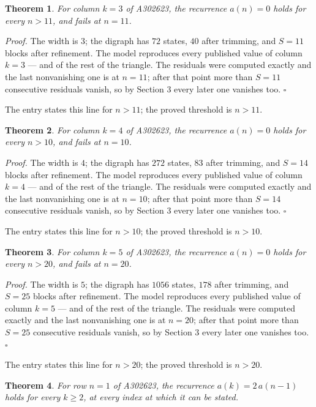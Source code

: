 \documentclass[11pt]{article}
\newtheorem{theorem}{Theorem}
\theoremstyle{definition}
\begin{document}
\begin{theorem} For column $k = 3$ of A302623, the recurrence $a(n) = 0$ holds for every $n > 11$, and fails at $n = 11$.\end{theorem}

{\itshape Proof.} The width is $3$; the digraph has $72$ states, $40$ after trimming, and $S = 11$ blocks after refinement. The model reproduces every published value of column $k = 3$ --- and of the rest of the triangle. The residuals were computed exactly and the last nonvanishing one is at $n = 11$; after that point more than $S = 11$ consecutive residuals vanish, so by Section 3 every later one vanishes too. $\square$

The entry states this line for $n > 11$; the proved threshold is $n > 11$.

\begin{theorem} For column $k = 4$ of A302623, the recurrence $a(n) = 0$ holds for every $n > 10$, and fails at $n = 10$.\end{theorem}

{\itshape Proof.} The width is $4$; the digraph has $272$ states, $83$ after trimming, and $S = 14$ blocks after refinement. The model reproduces every published value of column $k = 4$ --- and of the rest of the triangle. The residuals were computed exactly and the last nonvanishing one is at $n = 10$; after that point more than $S = 14$ consecutive residuals vanish, so by Section 3 every later one vanishes too. $\square$

The entry states this line for $n > 10$; the proved threshold is $n > 10$.

\begin{theorem} For column $k = 5$ of A302623, the recurrence $a(n) = 0$ holds for every $n > 20$, and fails at $n = 20$.\end{theorem}

{\itshape Proof.} The width is $5$; the digraph has $1056$ states, $178$ after trimming, and $S = 25$ blocks after refinement. The model reproduces every published value of column $k = 5$ --- and of the rest of the triangle. The residuals were computed exactly and the last nonvanishing one is at $n = 20$; after that point more than $S = 25$ consecutive residuals vanish, so by Section 3 every later one vanishes too. $\square$

The entry states this line for $n > 20$; the proved threshold is $n > 20$.

\begin{theorem} For row $n = 1$ of A302623, the recurrence $a(k) = 2\,a(n-1)$ holds for every $k \ge 2$, at every index at which it can be stated.\end{theorem}
\end{document}
